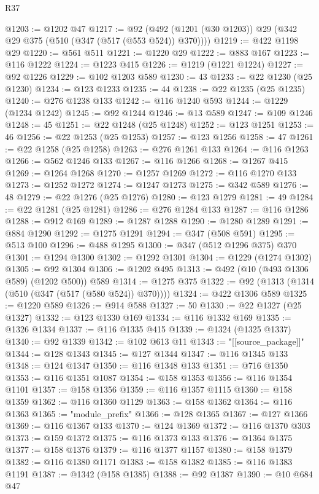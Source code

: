 \begin{lexlean}{R37}
\begin{coremodule}
@1203 := @1202 @47
@1217 := @92 (@492 (@1201 (@30 @1203)) @29 (@342 @29 @375 (@510 (@347 (@517 (@553 @524)) @370))))
@1219 := @422 @1198 @29
@1220 := @561 @511
@1221 := @1220 @29
@1222 := @883 @167
@1223 := @116 @1222
@1224 := @1223 @415
@1226 := @1219 (@1221 @1224)
@1227 := @92 @1226
@1229 := @102 @1203 @589
@1230 := 43
@1233 := @22 @1230 (@25 @1230)
@1234 := @123 @1233
@1235 := 44
@1238 := @22 @1235 (@25 @1235)
@1240 := @276 @1238 @133
@1242 := @116 @1240 @593
@1244 := @1229 (@1234 @1242)
@1245 := @92 @1244
@1246 := @13 @589
@1247 := @109 @1246
@1248 := 45
@1251 := @22 @1248 (@25 @1248)
@1252 := @123 @1251
@1253 := 46
@1256 := @22 @1253 (@25 @1253)
@1257 := @123 @1256
@1258 := 47
@1261 := @22 @1258 (@25 @1258)
@1263 := @276 @1261 @133
@1264 := @116 @1263
@1266 := @562 @1246 @133
@1267 := @116 @1266
@1268 := @1267 @415
@1269 := @1264 @1268
@1270 := @1257 @1269
@1272 := @116 @1270 @133
@1273 := @1252 @1272
@1274 := @1247 @1273
@1275 := @342 @589
@1276 := 48
@1279 := @22 @1276 (@25 @1276)
@1280 := @123 @1279
@1281 := 49
@1284 := @22 @1281 (@25 @1281)
@1286 := @276 @1284 @133
@1287 := @116 @1286
@1288 := @912 @169
@1289 := @1287 @1288
@1290 := @1280 @1289
@1291 := @884 @1290
@1292 := @1275 @1291
@1294 := @347 (@508 @591)
@1295 := @513 @100
@1296 := @488 @1295
@1300 := @347 (@512 @1296 @375) @370
@1301 := @1294 @1300
@1302 := @1292 @1301
@1304 := @1229 (@1274 @1302)
@1305 := @92 @1304
@1306 := @1202 @495
@1313 := @492 (@10 (@493 @1306 @589) (@1202 @500)) @589
@1314 := @1275 @375
@1322 := @92 (@1313 (@1314 (@510 (@347 (@517 (@580 @524)) @370))))
@1324 := @422 @1306 @589
@1325 := @1220 @589
@1326 := @914 @588
@1327 := 50
@1330 := @22 @1327 (@25 @1327)
@1332 := @123 @1330 @169
@1334 := @116 @1332 @169
@1335 := @1326 @1334
@1337 := @116 @1335 @415
@1339 := @1324 (@1325 @1337)
@1340 := @92 @1339
@1342 := @102 @613 @11
@1343 := "[[source_package]]"
@1344 := @128 @1343
@1345 := @127 @1344
@1347 := @116 @1345 @133
@1348 := @124 @1347
@1350 := @116 @1348 @133
@1351 := @716 @1350
@1353 := @116 @1351 @1087
@1354 := @158 @1353
@1356 := @116 @1354 @1101
@1357 := @158 @1356
@1359 := @116 @1357 @1115
@1360 := @158 @1359
@1362 := @116 @1360 @1129
@1363 := @158 @1362
@1364 := @116 @1363
@1365 := "module_prefix"
@1366 := @128 @1365
@1367 := @127 @1366
@1369 := @116 @1367 @133
@1370 := @124 @1369
@1372 := @116 @1370 @303
@1373 := @159 @1372
@1375 := @116 @1373 @133
@1376 := @1364 @1375
@1377 := @158 @1376
@1379 := @116 @1377 @1157
@1380 := @158 @1379
@1382 := @116 @1380 @1171
@1383 := @158 @1382
@1385 := @116 @1383 @1191
@1387 := @1342 (@158 @1385)
@1388 := @92 @1387
@1390 := @10 @684 @47

\end{coremodule}
\end{lexlean}
